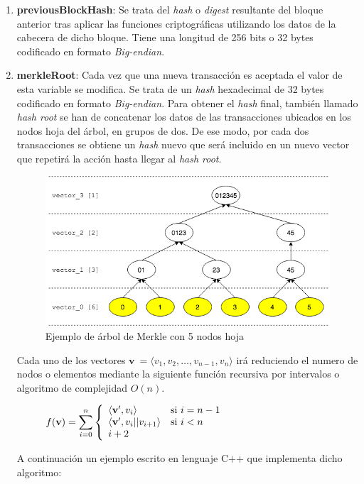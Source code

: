 \documentclass{article}
\begin{document}
\begin{enumerate}
        \item \textbf{previousBlockHash}: Se trata del \textit{hash} o \textit{digest} resultante del bloque anterior tras aplicar las funciones criptográficas utilizando los datos de la cabecera de dicho bloque. Tiene una longitud de 256 bits o 32 bytes codificado en formato \textit{Big-endian}.
        
        \item \textbf{merkleRoot}: Cada vez que una nueva transacción es aceptada el valor de esta variable se modifica. Se trata de un \textit{hash} hexadecimal de 32 bytes codificado en formato \textit{Big-endian}. Para obtener el \textit{hash} final, también llamado \textit{hash root} se han de concatenar los datos de las transacciones ubicados en los nodos hoja del árbol, en grupos de dos. De ese modo, por cada dos transacciones se obtiene un \textit{hash} nuevo que será incluido en un nuevo vector que repetirá la acción hasta llegar al \textit{hash root}.
        
        \begin{figure}[H]
        \centering
            \includegraphics[scale=0.53]{img/Merkle_tree_05_leaves_nodes}
            \caption{Ejemplo de árbol de Merkle con 5 nodos hoja}
        \end{figure}
        
        Cada uno de los vectores $\mathbf{v} \ = \langle v_{1}, v_{2}, \dots, v_{n - 1}, v_{n} \rangle$ irá reduciendo el numero de nodos o elementos mediante la siguiente función recursiva por intervalos o algoritmo de complejidad $O(n)$.
        
        \begin{figure}[H]
        \centering
            $f(\mathbf{v}) = \mathlarger{\sum}_{i=0}^{n} \left \{
            \begin{array}{ll}
                \langle \mathbf{v}^{\prime}, v_{i}\rangle & \mbox{si } i=n-1 \\
                \langle \mathbf{v}^{\prime}, v_{i}||v_{i+1} \rangle & \mbox{si } i < n \\
                i+2
            \end{array}
            \right .$
        \end{figure}
        A continuación un ejemplo escrito en lenguaje C++ que implementa dicho algoritmo:
        

\end{enumerate}
\end{document}
